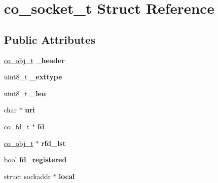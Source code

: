 \hypertarget{structco__socket__t}{\section{co\+\_\+socket\+\_\+t Struct Reference}
\label{structco__socket__t}
}
\subsection*{Public Attributes}
\begin{DoxyCompactItemize}
\item 
\hypertarget{structco__socket__t_a15cfa1d05f79ff825a2bf1cc642c550e}{\hyperlink{structco__obj__t}{co\+\_\+obj\+\_\+t} {\bfseries \+\_\+header}}\label{structco__socket__t_a15cfa1d05f79ff825a2bf1cc642c550e}

\item 
\hypertarget{structco__socket__t_a903dc2dbcce3df8145f00b6ff8d4df5e}{uint8\+\_\+t {\bfseries \+\_\+exttype}}\label{structco__socket__t_a903dc2dbcce3df8145f00b6ff8d4df5e}

\item 
\hypertarget{structco__socket__t_a40a7f1329f84097b24f19bebf9393253}{uint8\+\_\+t {\bfseries \+\_\+len}}\label{structco__socket__t_a40a7f1329f84097b24f19bebf9393253}

\item 
\hypertarget{structco__socket__t_ac11b40a1e999e998ba413a2669de7fcd}{char $\ast$ {\bfseries uri}}\label{structco__socket__t_ac11b40a1e999e998ba413a2669de7fcd}

\item 
\hypertarget{structco__socket__t_a47646b23fad18d0cfedd58fd2896a4a4}{\hyperlink{structco__fd__t}{co\+\_\+fd\+\_\+t} $\ast$ {\bfseries fd}}\label{structco__socket__t_a47646b23fad18d0cfedd58fd2896a4a4}

\item 
\hypertarget{structco__socket__t_af9905608f3a378735c7ec4c3d71ca801}{\hyperlink{structco__obj__t}{co\+\_\+obj\+\_\+t} $\ast$ {\bfseries rfd\+\_\+lst}}\label{structco__socket__t_af9905608f3a378735c7ec4c3d71ca801}

\item 
\hypertarget{structco__socket__t_ad6ed148323908011a8a3ac097673d383}{bool {\bfseries fd\+\_\+registered}}\label{structco__socket__t_ad6ed148323908011a8a3ac097673d383}

\item 
\hypertarget{structco__socket__t_a1f8a809c49b0ca11f0369215f332bb90}{struct sockaddr $\ast$ {\bfseries local}}\label{structco__socket__t_a1f8a809c49b0ca11f0369215f332bb90}


\end{DoxyCompactItemize}
